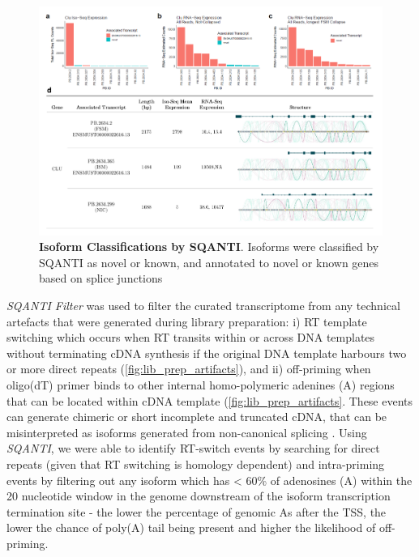 \begin{landscape}
\begin{figure}[h]
	\centering
	\includegraphics[page=3,trim={0 3cm 0 0},clip,scale = 0.8]{Figures/ProjectDevelopment_Figures_Landscape}
	\captionsetup{width=1.5\textwidth}
	\caption[Isoform Classifications by SQANTI]%
	{\textbf{Isoform Classifications by SQANTI}. Isoforms were classified by SQANTI as novel or known, and annotated to novel or known genes based on splice junctions}
	\label{fig:sqanti_cate}
\end{figure}
\end{landscape}

\textit{SQANTI Filter} was used to filter the curated transcriptome from any technical artefacts that were generated during library preparation: i) RT template switching which occurs when RT transits within or across DNA templates without terminating cDNA synthesis if the original DNA template harbours two or more direct repeats\cite{Cocquet2006} (\cref{fig:lib_prep_artifacts}), and ii) off-priming when oligo(dT) primer binds to other internal homo-polymeric adenines (A) regions that can be located within cDNA template \cite{Conesa2016} (\cref{fig:lib_prep_artifacts}. These events can generate chimeric or short incomplete and truncated cDNA, that can be misinterpreted as isoforms generated from non-canonical splicing \cite{Houseley2010}. Using \textit{SQANTI}, we were able to identify RT-switch events by searching for direct repeats (given that RT switching is homology dependent) and intra-priming events by filtering out any isoform which has < 60\% of adenosines (A) within the 20 nucleotide window in the genome downstream of the isoform transcription termination site - the lower the percentage of genomic As after the TSS, the lower the chance of poly(A) tail being present and  higher the likelihood of off-priming. 

